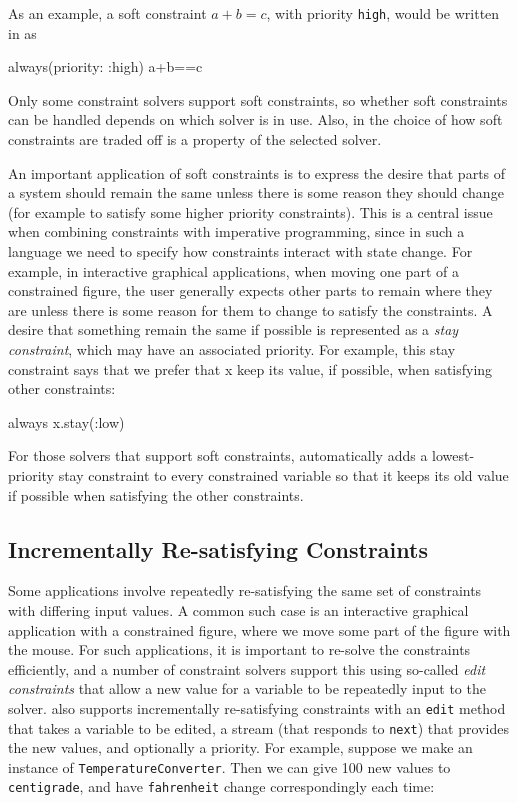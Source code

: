 As an example, a soft constraint $a+b=c$, with priority
\lstinline{high}, would be written in \toolname as
\begin{code}
always(priority: :high) {a+b==c}
\end{code}

Only some constraint solvers support soft constraints, so whether soft
constraints can be handled depends on which solver is in use.  Also,
in \langname the choice of how soft constraints are traded
off is a property of the selected solver.

An important application of soft constraints is to express the desire
that parts of a system should remain the same unless there is some
reason they should change (for example to satisfy some higher priority
constraints).  This is a central issue when combining constraints with
imperative programming, since in such a language we need to specify
how constraints interact with state change.  For example, in
interactive graphical applications, when moving one part of a
constrained figure, the user generally expects other parts to remain
where they are unless there is some reason for them to change to
satisfy the constraints.  A desire that something remain the same if
possible is represented as a \emph{stay constraint}, which may have an
associated priority.  For example, this stay constraint says that we
prefer that x keep its value, if possible, when satisfying other
constraints:

\begin{code}
always { x.stay(:low) }
\end{code}

For those solvers that support soft constraints, \langname
automatically adds a lowest-priority stay constraint to every constrained
variable so that it keeps its old value if possible when satisfying
the other constraints.

\subsection{Incrementally Re-satisfying Constraints}

Some applications involve repeatedly re-satisfying the same set of
constraints with differing input values.  A common such case is an
interactive graphical application with a constrained figure, where we
move some part of the figure with the mouse.  For such applications,
it is important to re-solve the constraints efficiently, and a number
of constraint solvers support this using so-called \emph{edit
  constraints} that allow a new value for a variable to be repeatedly
input to the solver.  \langname also supports incrementally
re-satisfying constraints with an \lstinline{edit} method that takes a
variable to be edited, a stream (that responds to \lstinline{next})
that provides the new values, and optionally a priority.  For example,
suppose we make an instance of \lstinline{TemperatureConverter}.  Then
we can give 100 new values to \lstinline{centigrade}, and have
\lstinline{fahrenheit} change correspondingly each time:

